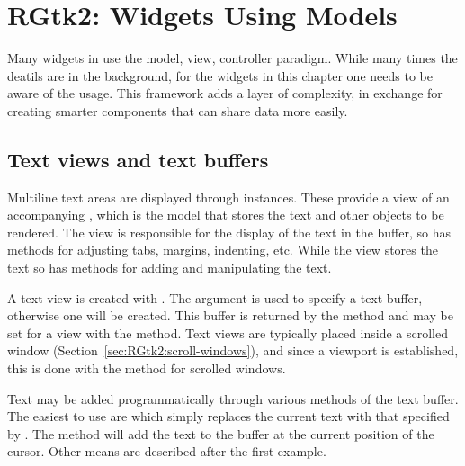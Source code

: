 

\chapter{RGtk2: Widgets Using Models}
\label{sec:RGtk2:widgets-with-models}

Many widgets in \GTK\/ use the model, view, controller paradigm. While
many times the deatils are in the background, for the widgets in this chapter
one needs to be aware of the usage. This framework adds a layer of
complexity, in exchange for creating smarter components that can share
data more easily.



\section{Text views and text buffers} %
\label{sec:RGtk2:textviews}

Multiline text areas are displayed through  
instances. These provide a view of an accompanying
, which is the model that stores the text and
other objects to be rendered. The view is responsible for the display
of the text in the buffer, so has methods for adjusting tabs, margins,
indenting, etc. While the view stores the text so has methods for
adding and manipulating the text.

A text view is created with . The
 argument is used to specify a text
buffer, otherwise one will be created. 
This buffer is returned by the
method  and may be set for a view with
the  method. Text views are typically
placed inside a scrolled window (Section~\ref{sec:RGtk2:scroll-windows}), and since a viewport is established,
this is done with the  method for scrolled
windows.


Text may be added programmatically through various 
methods of the text buffer. The easiest to use are  which
simply replaces the current text with that specified by
. The method
 will add the text to the buffer
at the current position of the cursor. Other means are described after
the first example.

